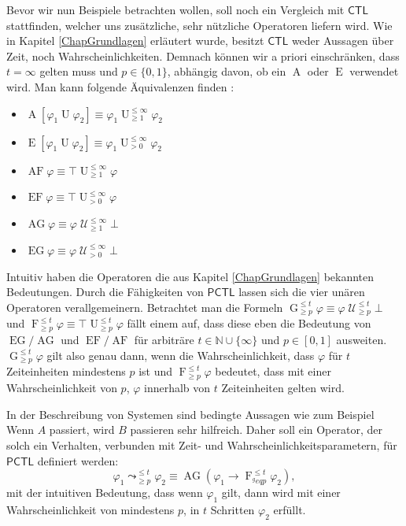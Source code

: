 \documentclass{lni}
\theoremstyle{def_style}
\theoremstyle{break}
\newcommand{\AU}[2]{\operatorname{A}[#1\operatorname{U}#2]}
\newcommand{\EU}[2]{\operatorname{E}[#1\operatorname{U}#2]}
\newcommand{\UEqual}[4]{#1\operatorname{U}^{\leq #2}_{\geq #3}#4}
\newcommand{\UStrict}[4]{#1\operatorname{U}^{\leq #2}_{> #3}#4}
\newcommand{\WeakEqual}[4]{#1\operatorname{\mathcal{U}}^{\leq #2}_{\geq #3}#4}
\newcommand{\WeakStrict}[4]{#1\operatorname{\mathcal{U}}^{\leq #2}_{> #3}#4}
\newcommand{\Arrow}[4]{#1 \leadsto^{\leq #2}_{\geq #3}#4}
\newcommand{\CTL}{\mathsf{CTL}}
\newcommand{\PCTL}{\mathsf{PCTL}}
\begin{document}
Bevor wir nun Beispiele betrachten wollen, soll noch ein Vergleich mit $\CTL$ stattfinden, welcher uns zusätzliche, sehr nützliche Operatoren liefern wird. 
Wie in Kapitel \ref{ChapGrundlagen} erläutert wurde, besitzt $\CTL$ weder Aussagen über Zeit, noch Wahrscheinlichkeiten. 
Demnach können wir a priori einschränken, dass $t=\infty$ gelten muss und $p\in\{0,1\}$, abhängig davon, ob ein $\operatorname{A}$ oder $\operatorname{E}$ verwendet wird.
Man kann folgende Äquivalenzen finden \cite{hansson1994logic}:
\begin{itemize}
	\item $\AU{\varphi_1}{\varphi_2} \equiv \UEqual{\varphi_1}{\infty}{1}{\varphi_2}$
	\item $\EU{\varphi_1}{\varphi_2} \equiv \UStrict{\varphi_1}{\infty}{0}{\varphi_2}$
	\item $\operatorname{AF}\varphi \equiv \UEqual{\top}{\infty}{1}{\varphi}$
	\item $\operatorname{EF}\varphi \equiv \UStrict{\top}{\infty}{0}{\varphi}$
	\item $\operatorname{AG}\varphi \equiv \WeakEqual{\varphi}{\infty}{1}{\bot}$
	\item $\operatorname{EG}\varphi \equiv \WeakStrict{\varphi}{\infty}{0}{\bot}$
\end{itemize}
Intuitiv haben die Operatoren die aus Kapitel \ref{ChapGrundlagen} bekannten Bedeutungen.
Durch die Fähigkeiten von $\PCTL$ lassen sich die vier unären Operatoren verallgemeinern. 
Betrachtet man die Formeln $\operatorname{G}^{\leq t}_{\geq p}\varphi \equiv \WeakEqual{\varphi}{t}{p}{\bot}$ und $\operatorname{F}^{\leq t}_{\geq p}\varphi \equiv \UEqual{\top}{t}{p}{\varphi}$ fällt einem auf, dass diese eben die Bedeutung von $\operatorname{EG}/\operatorname{AG}$ und $\operatorname{EF}/\operatorname{AF}$ für arbiträre $t\in \mathbb{N}\cup\{\infty\}$ und $p\in [0,1]$ ausweiten. 
$\operatorname{G}^{\leq t}_{\geq p}\varphi$ gilt also genau dann, wenn die Wahrscheinlichkeit, dass $\varphi$ für $t$ Zeiteinheiten mindestens $p$ ist und $\operatorname{F}^{\leq t}_{\geq p}\varphi$ bedeutet, dass mit einer Wahrscheinlichkeit von $p$, $\varphi$ innerhalb von $t$ Zeiteinheiten gelten wird. \cite{hansson1994logic}

In der Beschreibung von Systemen sind bedingte Aussagen wie zum Beispiel \glqq Wenn $A$ passiert, wird $B$ passieren\grqq{} sehr hilfreich. Daher soll ein Operator, der solch ein Verhalten, verbunden mit Zeit- und Wahrscheinlichkeitsparametern, für $\PCTL$ definiert werden:
$$\Arrow{\varphi_1}{t}{p}{\varphi_2} \equiv \operatorname{AG}(\varphi_1\rightarrow\operatorname{F}^{\leq t}_{^geq p} \varphi_2),$$
mit der intuitiven Bedeutung, dass wenn $\varphi_1$ gilt, dann wird mit einer Wahrscheinlichkeit von mindestens $p$, in $t$ Schritten $\varphi_2$ erfüllt. \cite{hansson1994logic}
\end{document}
